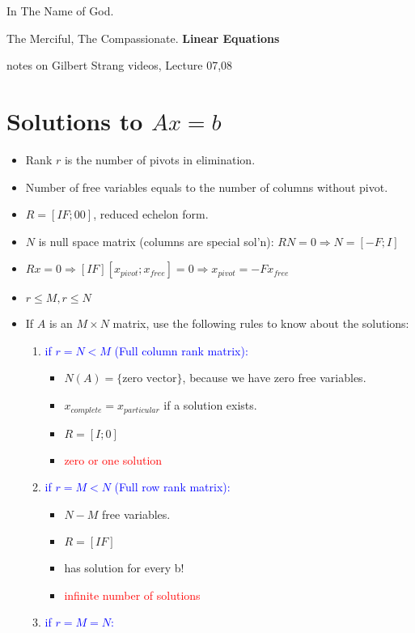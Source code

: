 \documentclass[a4paper,12pt]{article}
\newcommand{\blue}[1]{\textcolor{blue}{#1}}
\newcommand{\red}[1]{\textcolor{red}{#1}}
\begin{document}
\begin{center}
In The Name of God.

The Merciful, The Compassionate.
\vskip 1cm
{\Large\bfseries{Linear Equations}}

\vskip 0.2cm
\tiny{notes on Gilbert Strang videos, Lecture 07,08}
\end{center}

\section{Solutions to $Ax=b$}
\begin{itemize}
\item Rank $r$ is the number of pivots in elimination.
\item Number of free variables equals to the number of columns without pivot.
\item $R = [ I F;0 0 ]$, reduced echelon form.
\item $N$ is null space matrix (columns are special sol'n): $RN=0 \Rightarrow N = [ -F; I ]$
\item $Rx = 0 \Rightarrow [I F][x_{pivot}; x_{free}] = 0 \Rightarrow x_{pivot} = -Fx_{free}$
\item $r \leq M, r \leq N$
\item If $A$ is an $M \times N$ matrix, use the following rules to know about the solutions:
\begin{enumerate}
\item \blue{if $r = N < M$ (Full column rank matrix):}
\begin{itemize}
\item $N(A) = \{ \text{zero vector} \}$, because we have zero free variables.
\item $x_{complete} = x_{particular}$ if a solution exists.
\item $R = [ I; 0 ]$
\item \red{zero or one solution}
\end{itemize}
\item \blue{if $r = M < N$ (Full row rank matrix):}
\begin{itemize}
\item $N-M$ free variables.
\item $R=[IF]$
\item has solution for every b!
\item \red{infinite number of solutions}
\end{itemize}
\item \blue{if $r = M = N$:}
\begin{itemize}

\end{itemize}
\end{enumerate}
\end{itemize}
\end{document}
